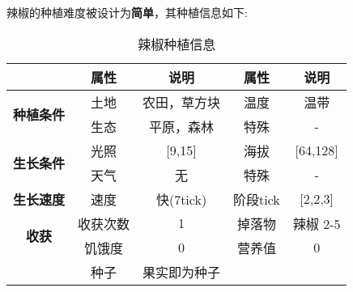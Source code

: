 辣椒的种植难度被设计为\textbf{简单}，其种植信息如下:

\begin{table}[H]
    \centering
    \caption{辣椒种植信息}
    \label{table:辣椒种植信息}
    \setlength{\tabcolsep}{4mm}
    \begin{tabular}{c|cc|cc}
        \toprule
                                           & \textbf{属性} & \textbf{说明} & \textbf{属性} & \textbf{说明} \\
        \midrule
        \multirow{2}{*}{\textbf{种植条件}} & 土地          & 农田，草方块  & 温度          & 温带          \\
                                           & 生态          & 平原，森林    & 特殊          & -             \\
        \midrule
        \multirow{2}{*}{\textbf{生长条件}} & 光照          & [9,15]        & 海拔          & [64,128]      \\
                                           & 天气          & 无            & 特殊          & -             \\
        \midrule
        \textbf{生长速度}                  & 速度          & 快(7tick)     & 阶段tick      & [2,2,3]       \\
        \midrule
        \multirow{2}{*}{\textbf{收获}}     & 收获次数      & 1             & 掉落物        & 辣椒 2-5      \\
                                           & 饥饿度        & 0             & 营养值        & 0             \\
                                           & 种子 & 果实即为种子 \\
        \bottomrule
    \end{tabular}
\end{table}

\newpage